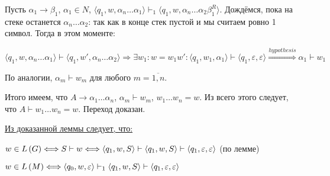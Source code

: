 Пусть $\alpha_1 \rightarrow \beta_1$, $\alpha_1 \in N$, $\langle q_1, w, \alpha_n \dots \alpha_1 \rangle \vdash_1 \langle q_1, w, \alpha_n \dots \alpha_2 \beta_1^R \rangle$. Дождёмся, пока на стеке останется $\alpha_n \dots \alpha_2$: так как в конце стек пустой и мы считаем ровно 1 символ. Тогда в этом моменте:

\begin{center}
    $\langle q_1, w, \alpha_n \dots \alpha_1 \rangle \vdash \langle q_1, w', \alpha_n \dots \alpha_2 \rangle \Longrightarrow \exists w_1 : w = w_1 w' : \langle q_1, w_1, \alpha_1 \rangle \vdash \langle q_1, \varepsilon, \varepsilon \rangle \overset{hypothesis}{\Longrightarrow} \alpha_1 \vdash w_1$
\end{center}

По аналогии, $\alpha_m \vdash w_m$ для любого $m = \overline{1, n}$.

Итого имеем, что $A \rightarrow \alpha_1 \dots \alpha_n$, $\alpha_m \vdash w_m$, $w_1 \dots w_n = w$. Из всего этого следует, что $A \vdash w_1 \dots w_n = w$. Переход доказан.

\underline{Из доказанной леммы следует, что:}

\begin{center}
    $w \in L \left({G}\right) \Longleftrightarrow S \vdash w \Longleftrightarrow \langle q_1, w, S \rangle \vdash \langle q_1, w, S \rangle \vdash \langle q_1, \varepsilon, \varepsilon \rangle$ (по лемме)
    
    $w \in L \left({M}\right) \Longleftrightarrow \langle q_0, w, \varepsilon \rangle \vdash_1 \langle q_1, w, S \rangle \vdash \langle q_1, \varepsilon, \varepsilon \rangle$
\end{center}

\EndProof